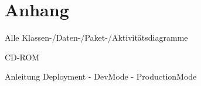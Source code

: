 
\section*{Anhang} \label{sec:anhang}

Alle Klassen-/Daten-/Paket-/Aktivitätsdiagramme

CD-ROM

Anleitung Deployment
    - DevMode
    - ProductionMode